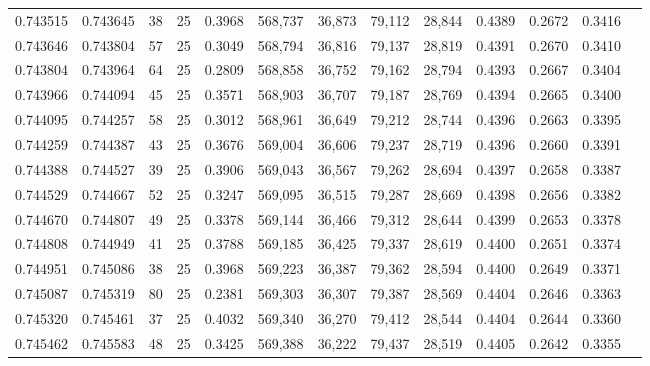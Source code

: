 \begin{tabular}{rrrrrrrrrrrrr}
0.743515 & 0.743645 &    38 &  25 &                                     0.3968 & 568,737 &  36,873 &  79,112 &  28,844 & 0.4389 & 0.2672 & 0.3416 \\
0.743646 & 0.743804 &    57 &  25 &                                     0.3049 & 568,794 &  36,816 &  79,137 &  28,819 & 0.4391 & 0.2670 & 0.3410 \\
0.743804 & 0.743964 &    64 &  25 &                                     0.2809 & 568,858 &  36,752 &  79,162 &  28,794 & 0.4393 & 0.2667 & 0.3404 \\
0.743966 & 0.744094 &    45 &  25 &                                     0.3571 & 568,903 &  36,707 &  79,187 &  28,769 & 0.4394 & 0.2665 & 0.3400 \\
0.744095 & 0.744257 &    58 &  25 &                                     0.3012 & 568,961 &  36,649 &  79,212 &  28,744 & 0.4396 & 0.2663 & 0.3395 \\
0.744259 & 0.744387 &    43 &  25 &                                     0.3676 & 569,004 &  36,606 &  79,237 &  28,719 & 0.4396 & 0.2660 & 0.3391 \\
0.744388 & 0.744527 &    39 &  25 &                                     0.3906 & 569,043 &  36,567 &  79,262 &  28,694 & 0.4397 & 0.2658 & 0.3387 \\
0.744529 & 0.744667 &    52 &  25 &                                     0.3247 & 569,095 &  36,515 &  79,287 &  28,669 & 0.4398 & 0.2656 & 0.3382 \\
0.744670 & 0.744807 &    49 &  25 &                                     0.3378 & 569,144 &  36,466 &  79,312 &  28,644 & 0.4399 & 0.2653 & 0.3378 \\
0.744808 & 0.744949 &    41 &  25 &                                     0.3788 & 569,185 &  36,425 &  79,337 &  28,619 & 0.4400 & 0.2651 & 0.3374 \\
0.744951 & 0.745086 &    38 &  25 &                                     0.3968 & 569,223 &  36,387 &  79,362 &  28,594 & 0.4400 & 0.2649 & 0.3371 \\
0.745087 & 0.745319 &    80 &  25 &                                     0.2381 & 569,303 &  36,307 &  79,387 &  28,569 & 0.4404 & 0.2646 & 0.3363 \\
0.745320 & 0.745461 &    37 &  25 &                                     0.4032 & 569,340 &  36,270 &  79,412 &  28,544 & 0.4404 & 0.2644 & 0.3360 \\
0.745462 & 0.745583 &    48 &  25 &                                     0.3425 & 569,388 &  36,222 &  79,437 &  28,519 & 0.4405 & 0.2642 & 0.3355 \\

\end{tabular}

